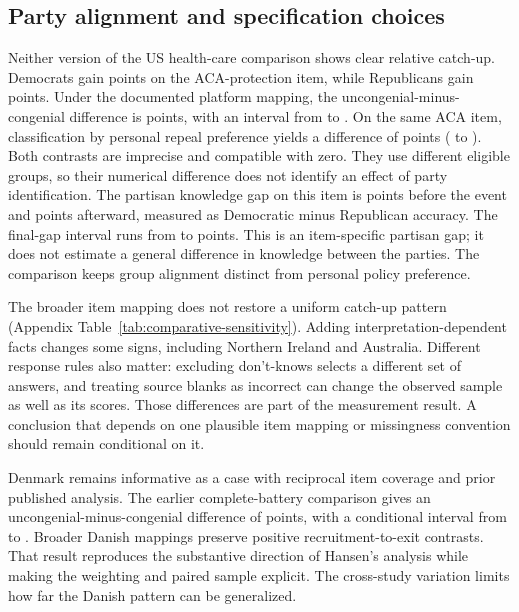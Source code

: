 \documentclass[11pt]{article}
\begin{document}
\subsection{Party alignment and specification choices}

Neither version of the US health-care comparison shows clear relative catch-up. Democrats gain \partyGainC{} points on the ACA-protection item, while Republicans gain \partyGainU{} points. Under the documented platform mapping, the uncongenial-minus-congenial difference is \partyDifference{} points, with an interval from \partyLow{} to \partyHigh{}. On the same ACA item, classification by personal repeal preference yields a difference of \acaPolicyDiff{} points (\acaPolicyLow{} to \acaPolicyHigh{}). Both contrasts are imprecise and compatible with zero. They use different eligible groups, so their numerical difference does not identify an effect of party identification. The partisan knowledge gap on this item is \partyGapPre{} points before the event and \partyGapPost{} points afterward, measured as Democratic minus Republican accuracy. The final-gap interval runs from \partyGapLow{} to \partyGapHigh{} points. This is an item-specific partisan gap; it does not estimate a general difference in knowledge between the parties. The comparison keeps group alignment distinct from personal policy preference.

The broader item mapping does not restore a uniform catch-up pattern (Appendix Table~\ref{tab:comparative-sensitivity}). Adding interpretation-dependent facts changes some signs, including Northern Ireland and Australia. Different response rules also matter: excluding don't-knows selects a different set of answers, and treating source blanks as incorrect can change the observed sample as well as its scores. Those differences are part of the measurement result. A conclusion that depends on one plausible item mapping or missingness convention should remain conditional on it.

Denmark remains informative as a case with reciprocal item coverage and prior published analysis. The earlier complete-battery comparison gives an uncongenial-minus-congenial difference of \coreDiff{} points, with a conditional interval from \coreLow{} to \coreHigh{}. Broader Danish mappings preserve positive recruitment-to-exit contrasts. That result reproduces the substantive direction of Hansen's analysis while making the weighting and paired sample explicit. The cross-study variation limits how far the Danish pattern can be generalized.
\end{document}
